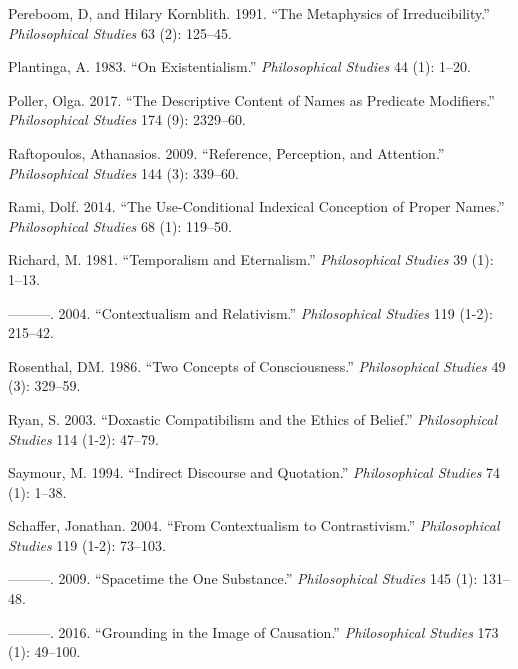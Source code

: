 \documentclass[
  10pt,
  letterpaper,
  DIV=11,
  numbers=noendperiod,
  twoside]{scrartcl}
\newlength{\cslhangindent}
\newenvironment{CSLReferences}[2] %
 {\begin{list}{}{%
  \setlength{\itemindent}{0pt}
  \setlength{\leftmargin}{0pt}
  \setlength{\parsep}{0pt}
  \ifodd #1
   \setlength{\leftmargin}{\cslhangindent}
   \setlength{\itemindent}{-1\cslhangindent}
  \fi
  \setlength{\itemsep}{#2\baselineskip}}}
 {\end{list}}
\begin{document}
\begin{CSLReferences}{1}{0}
Pereboom, D, and Hilary Kornblith. 1991. {``The Metaphysics of
Irreducibility.''} \emph{Philosophical Studies} 63 (2): 125--45.

Plantinga, A. 1983. {``On Existentialism.''} \emph{Philosophical
Studies} 44 (1): 1--20.

Poller, Olga. 2017. {``The Descriptive Content of Names as Predicate
Modifiers.''} \emph{Philosophical Studies} 174 (9): 2329--60.

Raftopoulos, Athanasios. 2009. {``Reference, Perception, and
Attention.''} \emph{Philosophical Studies} 144 (3): 339--60.

Rami, Dolf. 2014. {``The Use-Conditional Indexical Conception of Proper
Names.''} \emph{Philosophical Studies} 68 (1): 119--50.

Richard, M. 1981. {``Temporalism and Eternalism.''} \emph{Philosophical
Studies} 39 (1): 1--13.

---------. 2004. {``Contextualism and Relativism.''} \emph{Philosophical
Studies} 119 (1-2): 215--42.

Rosenthal, DM. 1986. {``Two Concepts of Consciousness.''}
\emph{Philosophical Studies} 49 (3): 329--59.

Ryan, S. 2003. {``Doxastic Compatibilism and the Ethics of Belief.''}
\emph{Philosophical Studies} 114 (1-2): 47--79.

Saymour, M. 1994. {``Indirect Discourse and Quotation.''}
\emph{Philosophical Studies} 74 (1): 1--38.

Schaffer, Jonathan. 2004. {``From Contextualism to Contrastivism.''}
\emph{Philosophical Studies} 119 (1-2): 73--103.

---------. 2009. {``Spacetime the One Substance.''} \emph{Philosophical
Studies} 145 (1): 131--48.

---------. 2016. {``Grounding in the Image of Causation.''}
\emph{Philosophical Studies} 173 (1): 49--100.


\end{CSLReferences}
\end{document}
